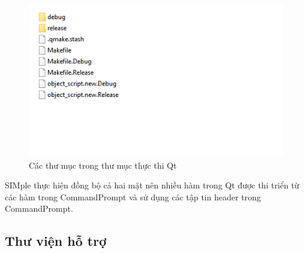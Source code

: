 \documentclass[12pt,a4paper]{report}
\begin{document}
			\begin{figure}[H]
				\centering

				\label{F:buildfolder}
				\includegraphics[scale = 1]{buildfolder.png}
				\caption{Các thư mục trong thư mục thực thi Qt}
			\end{figure}
		SIMple thực hiện đồng bộ cả hai mặt nên nhiều hàm trong Qt được thi triển từ các hàm trong CommandPrompt và sử dụng các tập tin header trong CommandPrompt.\\
		\subsection{Thư viện hỗ trợ}
\end{document}
